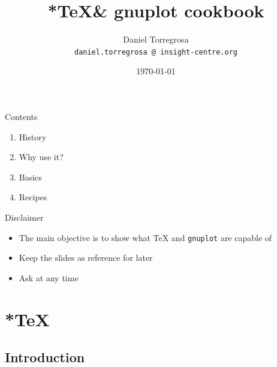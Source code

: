 \documentclass[english]{beamer}
\title{*\TeX \& gnuplot cookbook}
\subtitle{}
\author{Daniel Torregrosa \\ {\scriptsize \texttt{daniel.torregrosa @ insight-centre.org}}}
\date[\today]{\today}
\let\olditem\item
\renewcommand{\item}{\setlength{\itemsep}{\fill}\olditem}
\let\textttt\texttt
\renewcommand{\texttt}[1]{\colorbox{gray!10}{\textttt{#1}}}
\begin{document}
\begin{frame}
    \titlepage
\end{frame}

\begin{frame}{Contents}
\begin{enumerate}
    \item History
    \item Why use it?
    \item Basics
    \item Recipes
\end{enumerate}
\end{frame}

\begin{frame}{Disclaimer}
    \begin{itemize}
        \item The main objective is to show what \TeX{} and \texttt{gnuplot} are capable of
        \item Keep the slides as reference for later
        \item Ask at any time
    \end{itemize}
\end{frame}

\section{*\TeX}
\subsection{Introduction}
\end{document}
